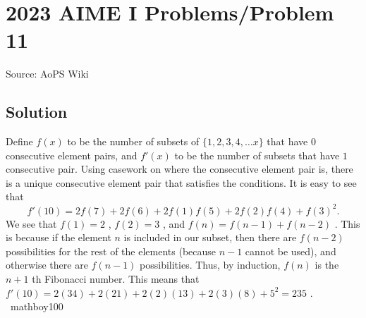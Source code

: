 \documentclass[12pt]{article}
\begin{document}
\section*{{2023 AIME I Problems/Problem 11}}
Source: AoPS Wiki

\subsection*{Solution}
Define $f(x)$ to be the number of subsets of $\{1, 2, 3, 4, \ldots x\}$ that have $0$ consecutive element pairs, and $f'(x)$ to be the number of subsets that have $1$ consecutive pair. Using casework on where the consecutive element pair is, there is a unique consecutive element pair that satisfies the conditions. It is easy to see that \[f'(10) = 2f(7) + 2f(6) + 2f(1)f(5) + 2f(2)f(4) + f(3)^2.\] We see that $f(1) = 2$ , $f(2) = 3$ , and $f(n) = f(n-1) + f(n-2)$ . This is because if the element $n$ is included in our subset, then there are $f(n-2)$ possibilities for the rest of the elements (because $n-1$ cannot be used), and otherwise there are $f(n-1)$ possibilities. Thus, by induction, $f(n)$ is the $n+1$ th Fibonacci number. This means that $f'(10) = 2(34) + 2(21) + 2(2)(13) + 2(3)(8) + 5^2 = \boxed{235}$ . ~mathboy100
\end{document}
